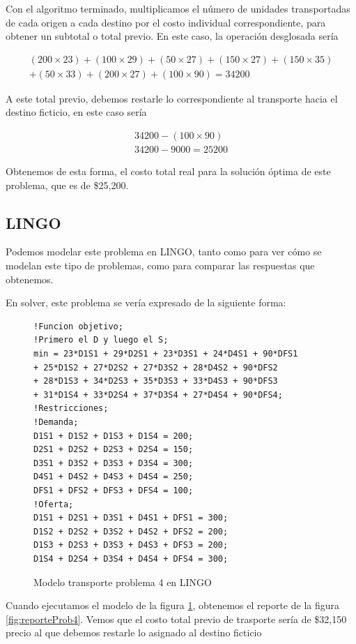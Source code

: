 \documentclass[12pt]{article}  %
\begin{document}
Con el algoritmo terminado, multiplicamos el número de unidades transportadas de cada origen a cada destino por el costo individual correspondiente, para obtener un subtotal o total previo. En este caso, la operación desglosada sería

\begin{align*}
(200 \times 23) + (100 \times 29) + (50 \times 27) + (150 \times 27) + (150 \times 35) \\
+ (50 \times 33) + (200 \times 27) + (100 \times 90) = 34200
\end{align*}

A este total previo, debemos restarle lo correspondiente al transporte hacia el destino ficticio, en este caso sería

\begin{align}
34200 - (100 \times 90) \\ 
34200 - 9000 = 25200
\end{align}

Obtenemos de esta forma, el costo total real para la solución óptima de este problema, que es de \$25,200.

\subsection{LINGO}
Podemos modelar este problema en LINGO, tanto como para ver cómo se modelan este tipo de problemas, como para comparar las respuestas que obtenemos.

En solver, este problema se vería expresado de la siguiente forma:

\begin{figure}[H]
	\centering
	\caption{Modelo transporte problema 4 en LINGO}
	\label{fig:lingoProb4}
	\begin{verbatim}
!Funcion objetivo;
!Primero el D y luego el S;
min = 23*D1S1 + 29*D2S1 + 23*D3S1 + 24*D4S1 + 90*DFS1
+ 25*D1S2 + 27*D2S2 + 27*D3S2 + 28*D4S2 + 90*DFS2
+ 28*D1S3 + 34*D2S3 + 35*D3S3 + 33*D4S3 + 90*DFS3
+ 31*D1S4 + 33*D2S4 + 37*D3S4 + 27*D4S4 + 90*DFS4;
!Restricciones;
!Demanda;
D1S1 + D1S2 + D1S3 + D1S4 = 200;
D2S1 + D2S2 + D2S3 + D2S4 = 150;
D3S1 + D3S2 + D3S3 + D3S4 = 300;
D4S1 + D4S2 + D4S3 + D4S4 = 250;
DFS1 + DFS2 + DFS3 + DFS4 = 100;
!Oferta;
D1S1 + D2S1 + D3S1 + D4S1 + DFS1 = 300;
D1S2 + D2S2 + D3S2 + D4S2 + DFS2 = 200;
D1S3 + D2S3 + D3S3 + D4S3 + DFS3 = 200;
D1S4 + D2S4 + D3S4 + D4S4 + DFS4 = 300;
	\end{verbatim}
\end{figure}

Cuando ejecutamos el modelo de la figura \ref{fig:lingoProb4}, obtenemos el reporte de la figura \ref{fig:reporteProb4}. Vemos que el costo total previo de trasporte sería de \$32,150 precio al que debemos restarle lo asignado al destino ficticio 
\end{document}
